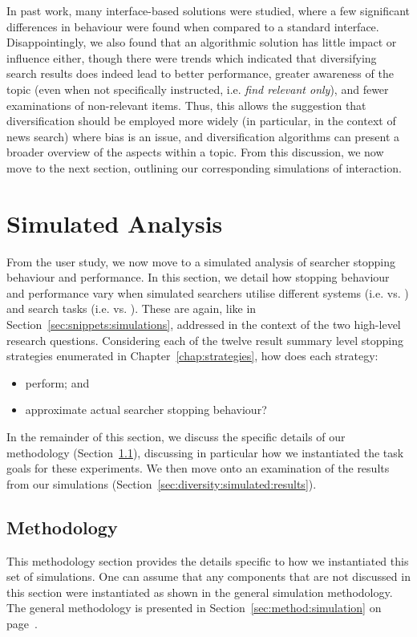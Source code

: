 In past work, many interface-based solutions were studied, where a few significant differences in behaviour were found when compared to a standard interface. Disappointingly, we also found that an algorithmic solution has little impact or influence either, though there were trends which indicated that diversifying search results does indeed lead to better performance, greater awareness of the topic (even when not specifically instructed, i.e. \emph{find relevant only}), and fewer examinations of non-relevant items. Thus, this allows the suggestion that diversification should be employed more widely (in particular, in the context of news search) where bias is an issue, and diversification algorithms can present a broader overview of the aspects within a topic. From this discussion, we now move to the next section, outlining our corresponding simulations of interaction.

\section{Simulated Analysis}\label{sec:diversity:simulated}
From the user study, we now move to a simulated analysis of searcher stopping behaviour and performance. In this section, we detail how stopping behaviour and performance vary when simulated searchers utilise different systems (i.e.  vs. ) and search tasks (i.e.  vs. ). These are again, like in Section~\ref{sec:snippets:simulations}, addressed in the context of the two high-level research questions. Considering each of the twelve result summary level stopping strategies enumerated in Chapter~\ref{chap:strategies}, how does each strategy:

\begin{itemize}
    \item{ perform; and}
    \item{ approximate actual searcher stopping behaviour?}
\end{itemize}

In the remainder of this section, we discuss the specific details of our methodology (Section~\ref{sec:diversity:simulated:method}), discussing in particular how we instantiated the task goals for these experiments. We then move onto an examination of the results from our simulations (Section~\ref{sec:diversity:simulated:results}).

\subsection{Methodology}\label{sec:diversity:simulated:method}
This methodology section provides the details specific to how we instantiated this set of simulations. One can assume that any components that are not discussed in this section were instantiated as shown in the general simulation methodology. The general methodology is presented in Section~\ref{sec:method:simulation} on page~\pageref{sec:method:simulation}.

